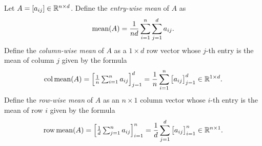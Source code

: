 \begin{definition}
    Let \(A = [a_{ij}] \in \mathbb{R}^{n \times d}\).
    Define the \textit{entry-wise mean} of \(A\) as
    \begin{equation}
        \label{eqn:matrix-mean}
        \operatorname{mean}(A) = \frac{1}{nd} \sum_{i=1}^{n} \sum_{j=1}^{d} a_{ij}.
    \end{equation}
    Define the \textit{column-wise mean} of \(A\) as a \(1 \times d\) row vector whose \(j\)-th entry is the mean of column \(j\) given by the formula
    \begin{align}
        \label{eqn:column-mean}
        \operatorname{col\,mean}(A)
        = \begin{bmatrix}
            \vphantom{\Big|}
            \frac{1}{n} \sum_{i=1}^{n} a_{ij}
        \end{bmatrix}_{j=1}^{d}
        = \frac{1}{n} \sum_{i=1}^{n} \left[ a_{ij} \vphantom{\big|}\right]_{j=1}^d \in \mathbb{R}^{1 \times d}.
    \end{align}
    Define the \textit{row-wise mean} of \(A\) as an \(n \times 1\) column vector whose \(i\)-th entry is the mean of row \(i\) given by the formula
    \begin{equation}
        \label{eqn:row-mean}
        \operatorname{row\,mean}(A)
        = \begin{bmatrix}
            \vphantom{\Big|}
            \frac{1}{d} \sum_{j=1}^{n} a_{ij}
        \end{bmatrix}_{i=1}^{n}
        = \frac{1}{d} \sum_{j=1}^{d} \left[ a_{ij} \vphantom{\big|}\right]_{i=1}^n \in \mathbb{R}^{n \times 1}.
    \end{equation}
\end{definition}

